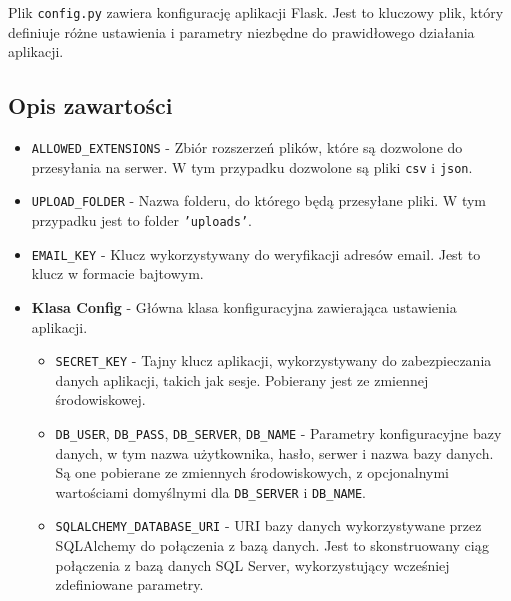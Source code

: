 \documentclass[12pt,a4paper]{report}
\begin{document}
Plik \texttt{config.py} zawiera konfigurację aplikacji Flask. Jest to kluczowy plik, który definiuje różne ustawienia i parametry niezbędne do prawidłowego działania aplikacji.

\subsection{Opis zawartości}
\begin{itemize}
    \item \texttt{ALLOWED\_EXTENSIONS} - Zbiór rozszerzeń plików, które są dozwolone do przesyłania na serwer. W tym przypadku dozwolone są pliki \texttt{csv} i \texttt{json}.

    \item \texttt{UPLOAD\_FOLDER} - Nazwa folderu, do którego będą przesyłane pliki. W tym przypadku jest to folder \texttt{'uploads'}.

    \item \texttt{EMAIL\_KEY} - Klucz wykorzystywany do weryfikacji adresów email. Jest to klucz w formacie bajtowym.

    \item \textbf{Klasa Config} - Główna klasa konfiguracyjna zawierająca ustawienia aplikacji.
    \begin{itemize}
        \item \texttt{SECRET\_KEY} - Tajny klucz aplikacji, wykorzystywany do zabezpieczania danych aplikacji, takich jak sesje. Pobierany jest ze zmiennej środowiskowej.

        \item \texttt{DB\_USER}, \texttt{DB\_PASS}, \texttt{DB\_SERVER}, \texttt{DB\_NAME} - Parametry konfiguracyjne bazy danych, w tym nazwa użytkownika, hasło, serwer i nazwa bazy danych. Są one pobierane ze zmiennych środowiskowych, z opcjonalnymi wartościami domyślnymi dla \texttt{DB\_SERVER} i \texttt{DB\_NAME}.

        \item \texttt{SQLALCHEMY\_DATABASE\_URI} - URI bazy danych wykorzystywane przez SQLAlchemy do połączenia z bazą danych. Jest to skonstruowany ciąg połączenia z bazą danych SQL Server, wykorzystujący wcześniej zdefiniowane parametry.
    \end{itemize}
\end{itemize}
\end{document}

